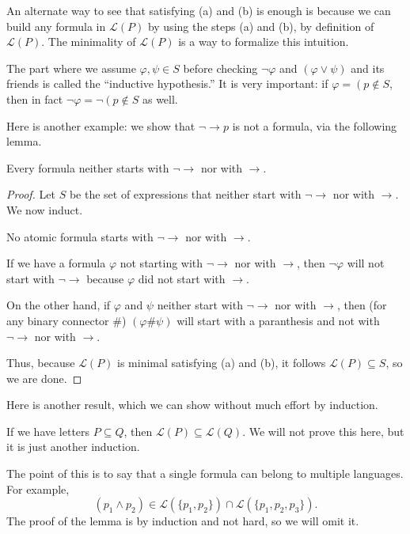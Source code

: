 An alternate way to see that satisfying (a) and (b) is enough is because we can build any formula in $\mathcal L(P)$ by using the steps (a) and (b), by definition of $\mathcal L(P)$. The minimality of $\mathcal L(P)$ is a way to formalize this intuition.
\begin{remark}
	The part where we assume $\varphi,\psi\in S$ before checking $\lnot\varphi$ and $(\varphi\lor\psi)$ and its friends is called the ``inductive hypothesis.'' It is very important: if $\varphi=\left(p\right.\notin S$, then in fact $\lnot\varphi=\lnot\left(p\right.\notin S$ as well.
\end{remark}
Here is another example: we show that $\lnot\to p$ is not a formula, via the following lemma.
\begin{lemma}
	Every formula neither starts with $\lnot\to$ nor with $\to$.
\end{lemma}
\begin{proof}
	Let $S$ be the set of expressions that neither start with $\lnot\to$ nor with $\to$. We now induct.
	\begin{listalph}
		\item No atomic formula starts with $\lnot\to$ nor with $\to$.
		\item If we have a formula $\varphi$ not starting with $\lnot\to$ nor with $\to$, then $\lnot\varphi$ will not start with $\lnot\to$ because $\varphi$ did not start with $\to$.

		On the other hand, if $\varphi$ and $\psi$ neither start with $\lnot\to$ nor with $\to$, then (for any binary connector $\#$) $(\varphi\#\psi)$ will start with a paranthesis and not with $\lnot\to$ nor with $\to$.
	\end{listalph}
	Thus, because $\mathcal L(P)$ is minimal satisfying (a) and (b), it follows $\mathcal L(P)\subseteq S$, so we are done.
\end{proof}
Here is another result, which we can show without much effort by induction.
\begin{lemma}
	If we have letters $P\subseteq Q$, then $\mathcal L(P)\subseteq\mathcal L(Q)$. We will not prove this here, but it is just another induction.
\end{lemma}
The point of this is to say that a single formula can belong to multiple languages. For example,
\[(p_1\land p_2)\in\mathcal L(\{p_1,p_2\})\cap\mathcal L(\{p_1,p_2,p_3\}).\]
The proof of the lemma is by induction and not hard, so we will omit it.\todo{}

